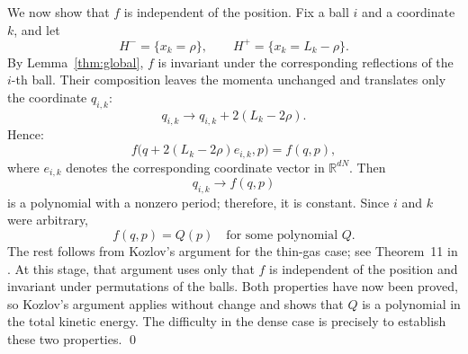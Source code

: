 \documentclass[12pt,reqno]{amsart}
\makeatletter
\renewenvironment{proof}[1][\proofname]{%
  \par\vspace{\topsep}%
  \normalfont\topsep6\p@\@plus6\p@\relax
  \trivlist
  \item[\hskip\labelsep\itshape #1\@addpunct{.}]\ignorespaces
}{%
  \endtrivlist
}
\numberwithin{equation}{section}
\def \R {\mathbb{R}}
\makeatother
\begin{document}
\begin{proof}[Proof of 
Theorem \ref{thm:gas}] 
We now show that \(f\) is independent of the position. Fix a ball \(i\)
and a coordinate \(k\), and let
\[
H^-=\{x_k=\rho\},
\qquad
H^+=\{x_k=L_k-\rho\}.
\]
By Lemma~\ref{thm:global}, \(f\) is invariant under the corresponding
reflections of the \(i\)-th ball. Their composition leaves the momenta
unchanged and translates only the coordinate \(q_{i,k}\):
\[
q_{i,k} \to q_{i,k}+2(L_k-2\rho).
\]
Hence:
\[
f\bigl(q+2(L_k-2\rho)e_{i,k},p\bigr)=f(q,p),
\]
where \(e_{i,k}\) denotes the corresponding coordinate vector in
\(\R^{dN}\). Then
\[
q_{i,k} \to f(q,p)
\]
is a polynomial with a nonzero period; therefore, it is constant. Since \(i\) and \(k\) were arbitrary, 
\[
f(q,p)=Q(p)\quad 
\text{for some polynomial \(Q\).}
\]
The rest follows from Kozlov's argument for the thin-gas case; see Theorem~11 in \cite{Kozlov}. At this stage, that argument uses only that \(f\) is independent of the position and invariant under permutations of the balls. Both properties have now been proved, so Kozlov's argument applies without change and shows that \(Q\) is a polynomial in the total kinetic energy. The difficulty in the dense case is precisely to establish these two properties. \qed


\end{proof}


\end{document}
